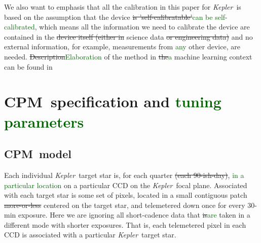 \documentclass[12pt, preprint]{aastex}
\newcommand{\project}[1]{\textsl{#1}}
\newcommand{\Kepler}{\project{Kepler}}
\newcommand{\name}{CPM}
\newcommand{\revise}[1]{\textcolor{darkgreen}{#1}}
\newcommand{\remove}[1]{\sout{#1}}
\begin{document}
We also want to emphasis that all the calibration in this paper for \Kepler\ is 
  based on the assumption that the device \remove{is 'self-calibratable'}\revise{can be self-calibrated}, 
  which means all the information we need to calibrate the device are contained in the \remove{device itself 
  (either in} science data \remove{or engineering data)} and no external information, 
  for example, measurements from \revise{any} other device, are needed.
\remove{Description}\revise{Elaboration} of the method in \remove{the}\revise{a} machine learning context can be found in \cite{icml2015}

\section{\name\ specification and \revise{tuning parameters}}
\subsection{\name\ model}
Each individual \Kepler\ target star is, for each quarter \remove{(each 90-ish-day)},
  \revise{in a particular location} on a particular CCD on the \Kepler\ focal plane.
Associated with each target star is some set of pixels,
  located in a small contiguous patch \remove{more-or-less} centered on the target star,
  and telemetered down once for every 30-min exposure.
Here we are ignoring all short-cadence data that \remove{is}\revise{are} taken in a different mode with shorter exposures.
That is, each telemetered pixel in each CCD is associated with a particular \Kepler\ target star.
\end{document}
